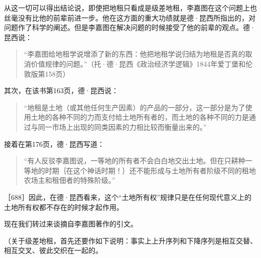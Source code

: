 从这一切可以得出结论说，即使把地租只看成是级差地租，李嘉图在这个问题上也丝毫没有比他的前辈前进一步。他在这方面的重大功绩就是德·昆西所指出的，对问题作了科学的阐述。但是李嘉图在解决问题的时候接受了他的前辈的观点。德·昆西说：

\begin{quote}{“李嘉图给地租学说增添了新的东西：他把地租学说归结为地租是否真的取消价值规律的问题。”（托·德·昆西《政治经济学逻辑》1844年爱丁堡和伦敦版第158页）}\end{quote}

其次，在该书第163页，德·昆西说：

\begin{quote}{“地租是土地（或其他任何生产因素）的产品的一部分，这一部分是为了使用土地的各种不同的力而支付给土地所有者的，而土地的各种不同的力是通过与同一市场上出现的同类因素的力相比较而衡量出来的。”}\end{quote}

接着在第176页，德·昆西写道：

\begin{quote}{“有人反驳李嘉图说，一等地的所有者不会白白地交出土地。但在只耕种一等地的时期｛在这个神话时期！｝还不能形成与土地所有者阶级不同的租地农场主和租佃者的特殊阶级。”}\end{quote}

［688］因此，在德·昆西看来，这个“土地所有权”规律只是在任何现代意义上的土地所有权都不存在的时候才起作用。

现在我们转过来谈摘自李嘉图著作的引文。


（关于级差地租，首先还要作如下说明：事实上上升序列和下降序列是相互交替、相互交叉、彼此交织在一起的。

